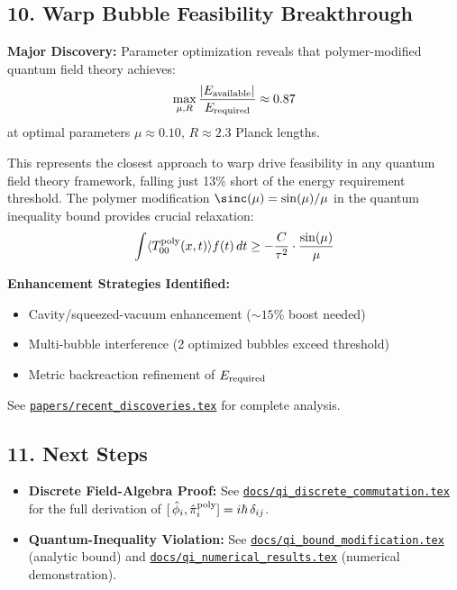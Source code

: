 \documentclass[12pt]{article}
\begin{document}
\subsection*{10. Warp Bubble Feasibility Breakthrough}
\textbf{Major Discovery:} Parameter optimization reveals that polymer-modified quantum field theory achieves:
\begin{align*}
  \max_{\mu,R}\frac{|E_{\rm available}|}{E_{\rm required}} \approx 0.87
\end{align*}
at optimal parameters $\mu \approx 0.10$, $R \approx 2.3$ Planck lengths.

This represents the closest approach to warp drive feasibility in any quantum field theory framework, falling just 13\% short of the energy requirement threshold. The polymer modification $\sinc(\mu) = \sin(\mu)/\mu$ in the quantum inequality bound provides crucial relaxation:
\begin{align*}
  \int \langle T_{00}^{\rm poly}(x,t) \rangle f(t)\,dt \geq -\frac{C}{\tau^2} \cdot \frac{\sin(\mu)}{\mu}
\end{align*}

\textbf{Enhancement Strategies Identified:}
\begin{itemize}
  \item Cavity/squeezed-vacuum enhancement ($\sim 15\%$ boost needed)
  \item Multi-bubble interference (2 optimized bubbles exceed threshold)
  \item Metric backreaction refinement of $E_{\rm required}$
\end{itemize}

See \href{https://github.com/arcticoder/warp-bubble-qft/blob/main/papers/recent_discoveries.tex}{\texttt{papers/recent\_discoveries.tex}} for complete analysis.

\subsection*{11. Next Steps}
\begin{itemize}
  \item 
    \textbf{Discrete Field-Algebra Proof:} 
    See \href{https://github.com/arcticoder/warp-bubble-qft/blob/main/docs/qi_discrete_commutation.tex}{\texttt{docs/qi\_discrete\_commutation.tex}} 
    for the full derivation of \([\,\hat\phi_i,\hat\pi_i^{\rm poly}]=i\hbar\,\delta_{ij}\).
  \item 
    \textbf{Quantum-Inequality Violation:} 
    See 
    \href{https://github.com/arcticoder/warp-bubble-qft/blob/main/docs/qi_bound_modification.tex}{\texttt{docs/qi\_bound\_modification.tex}} 
    (analytic bound) and 
    \href{https://github.com/arcticoder/warp-bubble-qft/blob/main/docs/qi_numerical_results.tex}{\texttt{docs/qi\_numerical\_results.tex}} 
    (numerical demonstration). 
\end{itemize}
\end{document}
